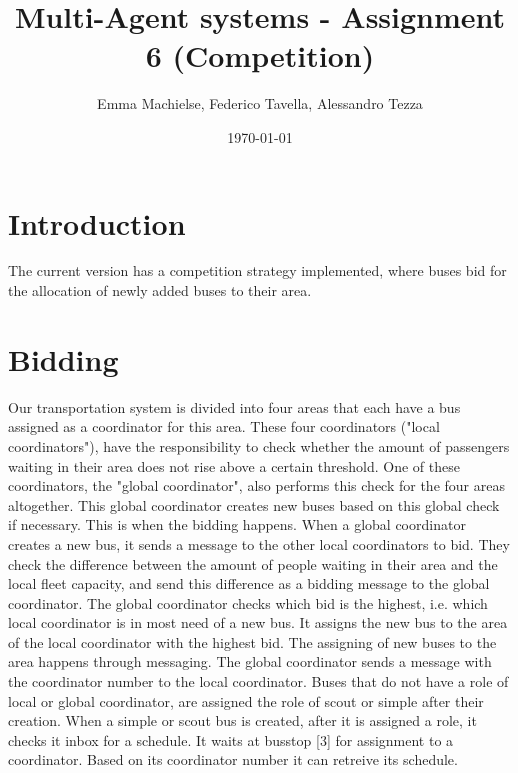 \documentclass[a4paper]{article}
\title{Multi-Agent systems - Assignment 6 (Competition)}
\author{Emma Machielse, Federico Tavella, Alessandro Tezza}
\date{\today}
\begin{document}
\maketitle

\section{Introduction}
The current version has a competition strategy implemented, where buses bid for the allocation of newly added buses to their area.

\section{Bidding} 

Our transportation system is divided into four areas that each have a bus assigned as a coordinator for this area. These four coordinators ("local coordinators"), have the responsibility to check whether the amount of passengers waiting in their area does not rise above a certain threshold. One of these coordinators, the "global coordinator", also performs this check for the four areas altogether. This global coordinator creates new buses based on this global check if necessary. 
\newline
This is when the bidding happens. When a global coordinator creates a new bus, it sends a message to the other local coordinators to bid. They check the difference between the amount of people waiting in their area and the local fleet capacity, and send this difference as a bidding message to the global coordinator. The global coordinator checks which bid is the highest, i.e. which local coordinator is in most need of a new bus. It assigns the new bus to the area of the local coordinator with the highest bid. 
\newline
The assigning of new buses to the area happens through messaging. The global coordinator sends a message with the coordinator number to the local coordinator. Buses that do not have a role of local or global coordinator, are assigned the role of scout or simple after their creation. When a simple or scout bus is created, after it is assigned a role, it checks it inbox for a schedule. It waits at busstop [3] for assignment to a coordinator. Based on its coordinator number it can retreive its schedule.
\end{document}
